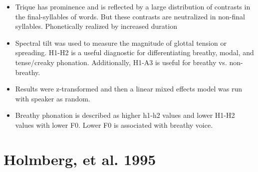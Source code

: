 \documentclass[12pt, letterpaper]{article}
\begin{document}
\begin{itemize}
	\item Trique has prominence and is reflected by a large distribution of contrasts in the final-syllables of words. But these contrasts are neutralized in non-final syllables. Phonetically realized by increased duration
	
	\item Spectral tilt was used to measure the magnitude of glottal tension or spreading. H1-H2 is a useful diagnostic for differentiating breathy, modal, and tense/creaky phonation. Additionally, H1-A3 is useful for breathy vs. non-breathy.
	
	\item Results were z-transformed and then a linear mixed effects model was run with speaker as random.
	
	\item Breathy phonation is described as higher h1-h2 values and lower H1-H2 values with lower F0. Lower F0 is associated with breathy voice.
\end{itemize}

\section{Holmberg, et al. 1995} \label{sec:Holmberg}
\end{document}

